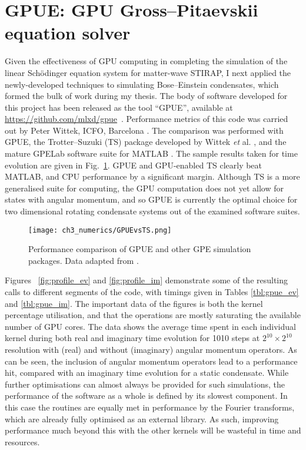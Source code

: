 \section{GPUE: GPU Gross--Pitaevskii equation solver}\label{sec:GPUE}

Given the effectiveness of GPU computing in completing the simulation of the linear Sch\"odinger equation system for matter-wave STIRAP, I next applied the newly-developed techniques to simulating Bose--Einstein condensates, which formed the bulk of work during my thesis. The body of software developed for this project has been released as the tool ``GPUE'', available at \url{https://github.com/mlxd/gpue}~\cite{MLXD_GPUE}. Performance metrics of this code was carried out by Peter Wittek, ICFO, Barcelona \cite{Wittek:2016}. The comparison was performed with GPUE, the Trotter--Suzuki (TS) package developed by Wittek \textit{et} al. \cite{NUM:Wittek_cpc_2013}, and the mature GPELab software suite for MATLAB \cite{NUM:GPElab_1,NUM:GPElab_2}. The sample results taken for time evolution are given in Fig.~\ref{fig:gpuevsts}. GPUE and GPU-enabled TS clearly beat MATLAB, and CPU performance by a significant margin. Although TS is a more generalised suite for computing, the GPU computation does not yet allow for states with angular momentum, and so GPUE is currently the optimal choice for two dimensional rotating condensate systems out of the examined software suites.

\begin{figure}[htb]
    \centering
    \texttt{[image: ch3\_numerics/GPUEvsTS.png]}
    \caption{Performance comparison of GPUE and other GPE simulation packages. Data adapted from \cite{Wittek:2016}.}
    \label{fig:gpuevsts}
\end{figure}

Figures ~\ref{fig:profile_ev} and \ref{fig:profile_im} demonstrate some of the resulting calls to different segments of the code, with timings given in Tables \ref{tbl:gpue_ev} and \ref{tbl:gpue_im}. The important data of the figures is both the kernel percentage utilisation, and that the operations are mostly saturating the available number of GPU cores. The data shows the average time spent in each individual kernel during both real and imaginary time evolution for 1010 steps at $2^{10}\times 2^{10}$ resolution with (real) and without (imaginary) angular momentum operators. As can be seen, the inclusion of angular momentum operators lead to a performance hit, compared with an imaginary time evolution for a static condensate. While further optimisations can almost always be provided for such simulations, the performance of the software as a whole is defined by its slowest component. In this case the routines are equally met in performance by the Fourier transforms, which are already fully optimised as an external library. As such, improving performance much beyond this with the other kernels will be wasteful in time and resources.

